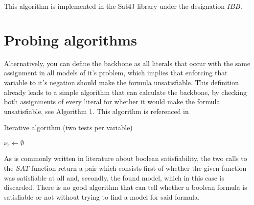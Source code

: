This algorithm is implemented in the Sat4J library under the designation $IBB$. 


\section{Probing algorithms}
Alternatively, you can define the backbone as all literals that occur with the same assignment in all models of it's problem, which implies that enforcing that variable to it's negation should make the formula unsatisfiable. This definition already leads to a simple algorithm that can calculate the backbone, by checking both assignments of every literal for whether it would make the formula unsatisfiable, see Algorithm 1. This algorithm is referenced in \cite{adebu83}
\begin{algorithm}
\caption{{\sc Iterative algorithm (two tests per variable)}}
\DontPrintSemicolon
{}
$\nu_r \gets \emptyset$\;
\;
\end{algorithm}

As is commonly written in literature about boolean satisfiability, the two calls to the $SAT$ function return a pair which consists first of whether the given function was satisfiable at all and, secondly, the found model, which in this case is discarded. There is no good algorithm that can tell whether a boolean formula is satisfiable or not without trying to find a model for said formula. 

